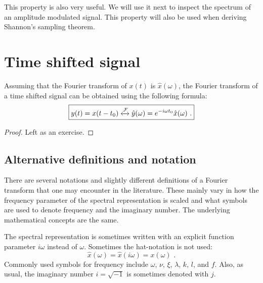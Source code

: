 This property is also very useful. We will use it next to inspect the spectrum of an amplitude modulated signal. This property will also be used when deriving Shannon's sampling theorem.

\section{Time shifted signal}
Assuming that the Fourier transform of $x(t)$ is $\hat{x}(\omega)$, the Fourier transform of a  time shifted signal can be obtained using the following formula:
\begin{equation}
\boxed{y(t) = x(t-t_0) \xleftrightarrow{\mathcal{F}} \hat{y}(\omega)= e^{-i\omega t_0}\hat{x}(\omega)\,\,.}
\label{eq:ft:timeshift}
\end{equation}
\begin{proof}
Left as an exercise.
\end{proof}

\subsection{Alternative definitions and notation}
There are several notations and slightly different definitions of a Fourier transform that one may encounter in the literature. 
These mainly vary in how the frequency parameter of the spectral representation is scaled and what symbols are used to denote frequency and the imaginary number. 
The underlying mathematical concepts are the same. 

The spectral representation is sometimes written with an explicit function parameter $i\omega$ instead of $\omega$. Sometimes the hat-notation is not used:
\begin{equation}
\hat{x}(\omega) = \hat{x}(i\omega) = x(\omega)\,\,.
\end{equation}
Commonly used symbols for frequency include $\omega$, $\nu$, $\xi$, $\lambda$, $k$, $l$, and $f$. Also, as usual, the imaginary number $i=\sqrt{-1}$ is sometimes denoted with $j$.


